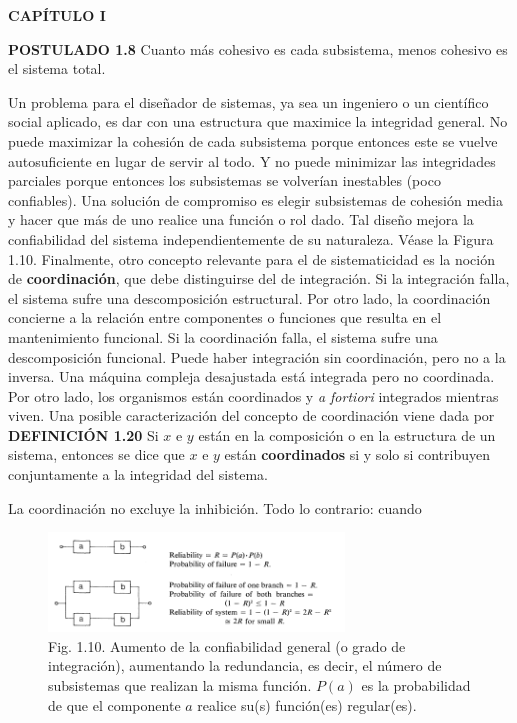\newpage
\fancyhf{}
\fancyhead[l]{\thepage}
\begin{center}
{\fontsize{13}{16}\selectfont \textbf{CAPÍTULO I}}
\end{center}
\vspace{0.5cm}

{\fontsize{13}{15}\selectfont
\textbf{POSTULADO 1.8} Cuanto más cohesivo es cada subsistema, menos cohesivo es el sistema total.

Un problema para el diseñador de sistemas, ya sea un ingeniero o un científico social aplicado, es dar con una estructura que maximice la integridad general. No puede maximizar la cohesión de cada subsistema porque entonces este se vuelve autosuficiente en lugar de servir al todo. 
Y no puede minimizar las integridades parciales porque entonces los subsistemas se volverían inestables (poco confiables). Una solución de compromiso es elegir subsistemas de cohesión media y hacer que más de uno realice una función o rol dado. Tal diseño mejora la confiabilidad del sistema independientemente de su naturaleza. Véase la Figura 1.10.
Finalmente, otro concepto relevante para el de sistematicidad es la noción de \textbf{coordinación}, que debe distinguirse del de integración. Si la integración falla, el sistema sufre una descomposición estructural. 
Por otro lado, la coordinación concierne a la relación entre componentes o funciones que resulta en el mantenimiento funcional. Si la coordinación falla, el sistema sufre una descomposición funcional. Puede haber integración sin coordinación, pero no a la inversa. 
Una máquina compleja desajustada está integrada pero no coordinada. Por otro lado, los organismos están coordinados y \textit{a fortiori} integrados mientras viven. Una posible caracterización del concepto de coordinación viene dada por\\

\textbf{DEFINICIÓN 1.20} Si \( x \) e \( y \) están en la composición o en la estructura de un sistema, entonces se dice que \( x \) e \( y \) están \textbf{coordinados} si y solo si contribuyen conjuntamente a la integridad del sistema.

La coordinación no excluye la inhibición. Todo lo contrario: cuando
}

\begin{figure}[h!]
    \centering
    \includegraphics[width=0.7\textwidth]{imagenes/figura1.10.png}
    \caption*{Fig. 1.10. Aumento de la confiabilidad general (o grado de integración), aumentando la redundancia, es decir, el número de subsistemas que realizan la misma función. \( P(a) \) es la probabilidad de que el componente \( a \) realice su(s) función(es) regular(es).}
\end{figure}

